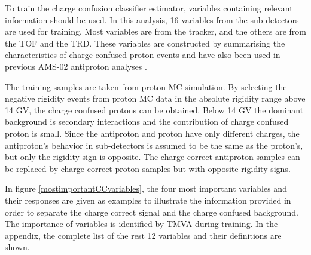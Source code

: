 To train the charge confusion classifier estimator, variables containing relevant information should be used. In this analysis, 16 variables from the sub-detectors are used for training. Most variables are from the tracker, and the others are from the TOF and the TRD. These variables are constructed by summarising the characteristics of charge confused proton events and have also been used in previous AMS-02  antiproton analyses \cite{AMS02AntiprotonPRL2016}. \par

The training samples are taken from proton MC simulation. By selecting the negative rigidity events from proton MC data in the absolute rigidity range above 14 GV, the charge confused protons can be obtained. Below 14 GV the dominant background is secondary interactions and the contribution of charge confused proton is small. Since the antiproton and proton have only different charges, the antiproton's behavior in sub-detectors is assumed to be the same as the proton's, but only the rigidity sign is opposite. The charge correct antiproton samples can be replaced by charge correct proton samples but with opposite rigidity signs. \par

In figure \ref{mostimportantCCvariables}, the four most important variables and their responses are given as examples to illustrate the information provided in order to separate the charge correct signal and the charge confused background. The importance of variables is identified by TMVA \cite{TMVA2009} during training. In the appendix, the complete list of the rest 12 variables and their definitions are shown. \par

